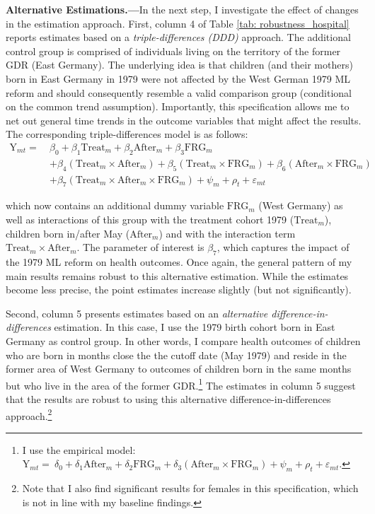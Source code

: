 \documentclass[11pt, a4paper, draft]{article} %
\begin{document}
\textbf{Alternative Estimations.---}In the next step, I investigate the effect of changes in the estimation approach. First, column 4 of Table \ref{tab: robustness_hospital} reports estimates based on a \textit{triple-differences (DDD)} approach. The additional control group is comprised of individuals living on the territory of the former GDR (East Germany). The underlying idea is that children (and their mothers) born in East Germany in 1979 were not affected by the West German 1979 ML reform and should consequently resemble a valid comparison group (conditional on the common trend assumption). Importantly, this specification allows me to net out general time trends in the outcome variables that might affect the results. The corresponding triple-differences model is as follows:
\begin{align}
\text{Y}_{mt} =\ &\beta_0 + \beta_1 \text{Treat}_{m} + \beta_2 \text{After}_{m} + \beta_3 \text{FRG}_m \nonumber\\&+ \beta_4 (\text{Treat}_{m} \times \text{After}_{m}) + \beta_5 (\text{Treat}_m \times \text{FRG}_m) + \beta_6 (\text{After}_m \times \text{FRG}_m) \nonumber\\ &+ \beta_7 (\text{Treat}_m\times \text{After}_m\times \text{FRG}_m) + \psi_m + \rho_t + \varepsilon_{mt} \label{eq:DDD}
\end{align}

which now contains an additional dummy variable $\text{FRG}_m$ (West Germany) as well as interactions of this group with the treatment cohort 1979 ($\text{Treat}_{m}$), children born in/after May ($\text{After}_{m}$) and with the interaction term $\text{Treat}_{m} \times \text{After}_{m}$. The parameter of interest is $\beta_7$, which captures the impact of the 1979 ML reform on health outcomes. Once again, the general pattern of my main results remains robust to this alternative estimation. While the estimates become less precise, the point estimates increase slightly (but not significantly).

Second, column 5 presents estimates based on an \textit{alternative difference-in-differences} estimation. In this case, I use the 1979 birth cohort born in East Germany as control group. In other words, I compare health outcomes of children who are born in months close the the cutoff date (May 1979) and reside in the former area of West Germany to outcomes of children born in the same months but who live in the area of the former GDR.\footnote{I use the empirical model: $\text{Y}_{mt} =\ \delta_0 + \delta_1 \text{After}_{m} + \delta_2 \text{FRG}_m + \delta_3 (\text{After}_m \times \text{FRG}_m) + \psi_m + \rho_t + \varepsilon_{mt}$.} The estimates in column 5 suggest that the results are robust to using this alternative difference-in-differences approach.\footnote{Note that I also find significant results for females in this specification, which is not in line with my baseline findings.}
\end{document}
